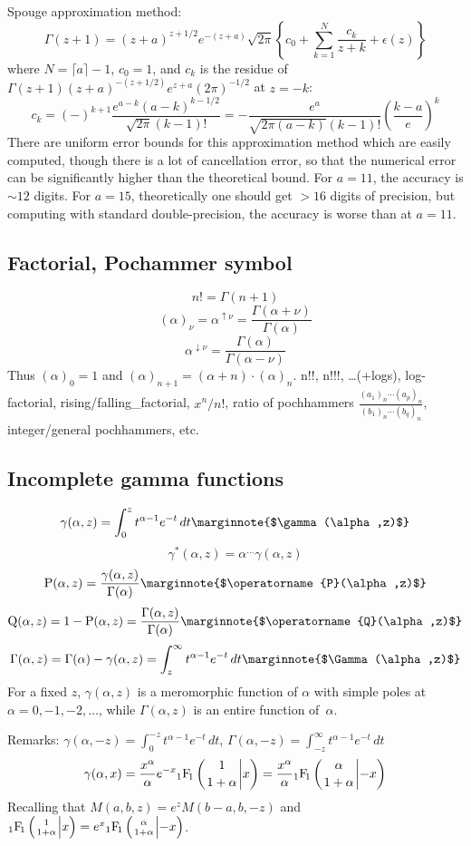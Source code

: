 \documentclass[10pt,dvipdfmx,letterpaper,twoside]{article}
\let\O=\operatorname
\newcommand{\Hyper}[5]{{\mathop{{}_{#1}\!\O{F\!}_{#2}\left({\genfrac{}{}{0pt}{}{#3}{#4}}\middle|{#5}\right)}}}
\let\DEF=\marginnote
\let\al=\alpha
\let\gam=\gamma
\let\Gam=\Gamma
\begin{document}
Spouge approximation method:
\[ \Gam(z+1) = (z+a)^{z+1/2} e^{-(z+a)} \sqrt{2\pi}\left\{ c_0 + \sum_{k=1}^{N} \frac{c_k}{z+k} + \epsilon(z) \right\} \]
where $N=\lceil a \rceil - 1$, $c_0=1$, and $c_k$ is the residue of $\Gam(z+1)(z+a)^{-(z+1/2)} e^{z+a}(2\pi)^{-1/2}$ at $z=-k$:
\[ c_k = (-)^{k+1}\frac{e^{a-k} (a-k)^{k-1/2}}{\sqrt{2\pi}(k-1)!} = -\frac{e^a}{\sqrt{2\pi(a-k)}(k-1)!}\left(\frac{k-a}{e}\right)^k \]
There are uniform error bounds for this approximation method which are easily computed, though there is a lot of cancellation error,
so that the numerical error can be significantly higher than the theoretical bound.
For $a=11$, the accuracy is $\sim12$ digits.  For $a=15$, theoretically one should get $>16$ digits of precision, but computing with
standard double-precision, the accuracy is worse than at $a=11$.


\subsection{Factorial, Pochammer symbol}
\[ n! = \Gam(n+1) \]
\[ (\al)_\nu = \al^{\uparrow \nu} = \frac{\Gam(\al+\nu)}{\Gam(\al)} \]
\[ \al^{\downarrow \nu} = \frac{\Gam(\al)}{\Gam(\al-\nu)} \]
Thus $(\al)_0 = 1$ and $(\al)_{n+1} = (\al+n)\cdot(\al)_n$.
n!!, n!!!, \dots (+logs), log-factorial, rising/falling\_factorial, $x^n/n!$,
ratio of pochhammers $\frac{(a_1)_n\cdots(a_p)_n}{(b_1)_n\cdots(b_q)_n}$,
integer/general pochhammers, etc.

\subsection{Incomplete gamma functions}

\[ \gam(\al,z) = \int_0^z t^{\al-1}e^{-t}\,dt   \DEF{$\gam(\al,z)$}\]
\[ \gam^*(\al,z) = \al^{\dots}\gam(\al,z) \]
\[ \O{P}(\al,z) = \frac{\gam(\al,z)}{\Gam(\al)}   \DEF{$\O{P}(\al,z)$}\]
\[ \O{Q}(\al,z) = 1 - \O{P}(\al,z) = \frac{\Gam(\al,z)}{\Gam(\al)}    \DEF{$\O{Q}(\al,z)$}\]
\[ \Gam(\al,z) = \Gam(\al) - \gam(\al,z) = \int_z^\infty t^{\al-1}e^{-t}\,dt \DEF{$\Gam(\al,z)$}\]
For a fixed $z$, $\gamma(\al,z)$ is a meromorphic function of $\al$ with simple poles at $\al=0,-1,-2,\dots$,
while $\Gam(\al,z)$ is an entire function of~$\al$.

Remarks: $\gam(\al,-z)=\int_0^{-z}t^{\al-1}e^{-t}\,dt$, $\Gam(\al,-z)=\int_{-z}^\infty t^{\al-1}e^{-t}\,dt$
\[ \gam(\al,x) = \frac{x^\al}{\al} e^{-x} \Hyper{1}{1}{1}{1+\al}{x} = \frac{x^\al}{\al}\Hyper{1}{1}{\al}{1+\al}{-x} \]
Recalling that $M(a,b,z)=e^{z} M(b-a,b,-z)$ and $\Hyper{1}{1}{1}{1+\al}{x}=e^{x}\Hyper{1}{1}{\al}{1+\al}{-x}$.
\end{document}
